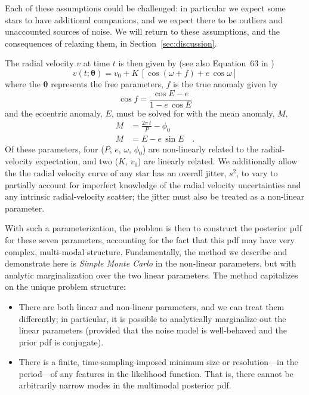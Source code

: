\documentclass[manuscript, letterpaper]{aastex6}
\newcommand{\sectionname}{Section}
\newcommand{\eqname}{Equation}
\newcommand{\bs}[1]{\boldsymbol{#1}}
\begin{document}
Each of these assumptions could be challenged: in particular we expect some stars
to have additional companions, and we expect there to be outliers and
unaccounted sources of noise.
We will return to these assumptions, and the consequences of relaxing them, in
\sectionname~\ref{sec:discussion}.

The radial velocity $v$ at time $t$ is then given by (see also \eqname~63 in
\citealt{Murray:2010})
\begin{equation}
  v(t;\bs{\theta}) = v_0 + K\,[\cos(\omega + f) + e\,\cos\omega]
\end{equation}
where the $\bs{\theta}$ represents the free parameters, $f$ is the true anomaly
given by
\begin{equation}
  \cos f = \frac{\cos E - e}{1 - e\, \cos E}
\end{equation}
and the eccentric anomaly, $E$, must be solved for with the mean
anomaly, $M$,
\begin{align}
  M &= \frac{2\pi\, t}{P} - \phi_0\\
  M &= E - e\,\sin E \quad .
\end{align}
Of these parameters, four ($P$, $e$, $\omega$, $\phi_0$) are non-linearly
related to the radial-velocity expectation, and two ($K$, $v_0$) are
linearly related.
We additionally allow the the radial velocity curve of any star has an overall
jitter, $s^2$, to vary to partially account for
imperfect knowledge of the radial velocity uncertainties and any intrinsic
radial-velocity scatter; the jitter must also be treated as a non-linear
parameter.

With such a parameterization, the problem is then to construct the posterior pdf
for these seven parameters, accounting for the fact that this pdf
may have very complex, multi-modal structure.
Fundamentally, the method we describe and demonstrate here is
\emph{Simple Monte Carlo} in the non-linear parameters, but with analytic
marginalization over the two linear parameters.
The method capitalizes on the unique problem structure:
\begin{itemize}\itemsep0ex
\item There are both linear and non-linear parameters, and we can
  treat them differently; in particular, it is possible to
  analytically marginalize out the linear parameters (provided that the
  noise model is well-behaved and the prior pdf is conjugate).
\item There is a finite, time-sampling-imposed minimum size or
  resolution---in the period---of any features in the
  likelihood function. That is, there cannot be arbitrarily narrow
  modes in the multimodal posterior pdf.
\end{itemize}
\end{document}

